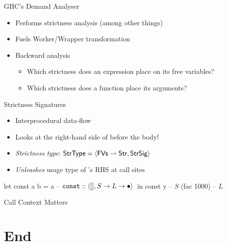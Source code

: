 \documentclass{haskellbeamer}
\begin{document}
\begin{frame}[fragile]{GHC's Demand Analyser}
  \begin{itemize}
    \item Performs strictness analysis (among other things)
    \item Fuels Worker/Wrapper transformation
    \item Backward analysis
      \begin{itemize}
        \item Which strictness does an expression place on its free variables?
        \item Which strictness does a function place its arguments?
      \end{itemize}
  \end{itemize}
\end{frame}

\begin{frame}[fragile]{Strictness Signatures}
  \begin{itemize}
    \item Interprocedural data-flow
    \item Looks at the right-hand side of  before the  body!
    \item \emph{Strictness type}: $\text{\textsf{StrType}} = \left\langle{}\text{\textsf{FVs}} \rightharpoonup \text{\textsf{Str}},\text{\textsf{StrSig}}\right\rangle{}$
    \item \emph{Unleashes} usage type of 's RHS at call sites
  \end{itemize}
  \begin{center}
    \begin{minipage}{0.8\textwidth}
      \begin{haskell}
        let const a b = a -- $\mathtt{const} :: \left\langle{}[],S \to L \to \bullet\right\rangle{}$
        in const 
            y             -- $S$
            (fac 1000)    -- $L$
      \end{haskell}
    \end{minipage}
  \end{center}
\end{frame}

\begin{frame}[fragile]{Call Context Matters}
\end{frame}
  
\section{End}
\end{document}
